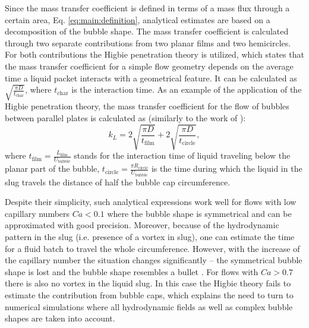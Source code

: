 \documentclass{article}
\newcommand{\beq}{\begin{equation}}
\newcommand{\feq}{\end{equation}}
\newcommand{\lfilm}{L_{\mathrm{film}}}
\newcommand{\ububble}{U_{\mathrm{bubble}}}
\begin{document}
Since the mass transfer coefficient is defined in terms of a mass flux through a certain area, Eq. \ref{eq:main:definition},
analytical estimates \cite{kreutzer-overview,irandoust} are based on a decomposition of the bubble shape. The mass
 transfer coefficient is calculated through two separate contributions from two planar films and two hemicircles. For both 
contributions the Higbie penetration theory \cite{higbie} is utilized, which states that the mass transfer coefficient
 for a simple flow geometry depends on the average time a liquid packet interacts with a geometrical feature. It 
can be calculated as $\sqrt{\frac{\pi D}{t_{\mathrm{char}}}}$, where $t_{\mathrm{char}}$ is the interaction 
time. As an example of the application of the Higbie penetration theory,
 the mass  transfer coefficient 
for the flow of bubbles between parallel plates  is calculated as (similarly to the work of \citet{vanbaten-circular}):
\beq
k_L=2 \sqrt{\frac{\pi D}{t_{\mathrm{film}}}}+2 \sqrt{\frac{\pi D}{t_{\mathrm{circle}}}},
\feq
where $t_{\mathrm{film}}=\frac{\lfilm}{\ububble}$ stands for the interaction time of liquid traveling below the planar part
 of the bubble, $t_{\mathrm{circle}}=\frac{\pi R_{\mathrm{circle}}}{\ububble}$ is the time during which the liquid in the slug travels the distance of half the bubble cap circumference. 

Despite their simplicity, such analytical expressions work well for flows with low
capillary numbers $Ca<0.1$ \cite{bercic-mass} where the bubble shape is
symmetrical and can be approximated with good precision. Moreover, because of the
hydrodynamic pattern in the slug (i.e. presence of a vortex in slug), one can
estimate the time for a fluid batch to travel the whole circumference.   However,
with the increase of the capillary number the situation changes significantly -- the
symmetrical bubble shape is lost and the bubble shape resembles a bullet \cite{kuzmin-binary2d}.
For flows with $Ca>0.7$ there is also no vortex in the liquid slug. In this case the Higbie theory fails
to estimate the contribution from bubble caps, which explains the need to turn to numerical simulations where all
hydrodynamic fields as well as complex bubble shapes are taken into account.
\end{document}

